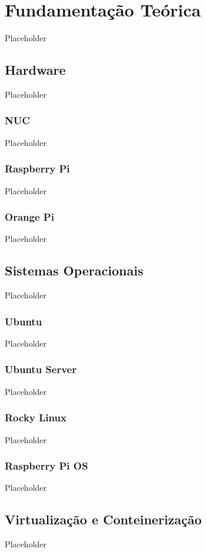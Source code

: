 \chapter{Fundamentação Teórica}
\label{chap2}

Placeholder

\section{Hardware}
Placeholder

\subsection{NUC}
Placeholder

\subsection{Raspberry Pi}
Placeholder

\subsection{Orange Pi}
Placeholder

\section{Sistemas Operacionais}
Placeholder

\subsection{Ubuntu}
Placeholder

\subsection{Ubuntu Server}
Placeholder

\subsection{Rocky Linux}
Placeholder

\subsection{Raspberry Pi OS}
Placeholder

\section{Virtualização e Conteinerização}
Placeholder


